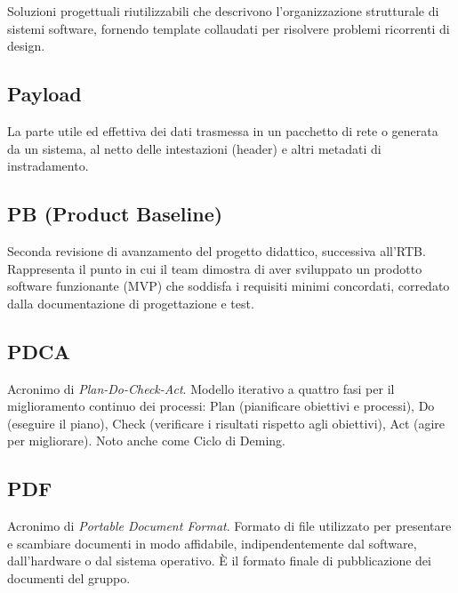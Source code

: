 \documentclass[a4paper, 11pt, oneside]{scrartcl} %
\begin{document}

Soluzioni progettuali riutilizzabili che descrivono l'organizzazione strutturale di sistemi software, fornendo template collaudati per risolvere problemi ricorrenti di design.

\vspace{0.5cm}

\subsection*{Payload}
La parte utile ed effettiva dei dati trasmessa in un pacchetto di rete o generata da un sistema, al netto delle intestazioni (header) e altri metadati di instradamento.
\vspace{0.5cm}

\subsection*{PB (Product Baseline)}
Seconda revisione di avanzamento del progetto didattico, successiva all'RTB. Rappresenta il punto in cui il team dimostra di aver sviluppato un prodotto software funzionante (MVP) che soddisfa i requisiti minimi concordati, corredato dalla documentazione di progettazione e test.
\vspace{0.5cm}

\subsection*{PDCA}
Acronimo di \textit{Plan-Do-Check-Act}. Modello iterativo a quattro fasi per il miglioramento continuo dei processi: Plan (pianificare obiettivi e processi), Do (eseguire il piano), Check (verificare i risultati rispetto agli obiettivi), Act (agire per migliorare). Noto anche come Ciclo di Deming.
\vspace{0.5cm}

\subsection*{PDF}
Acronimo di \textit{Portable Document Format}. Formato di file utilizzato per presentare e scambiare documenti in modo affidabile, indipendentemente dal software, dall'hardware o dal sistema operativo. È il formato finale di pubblicazione dei documenti del gruppo.
\vspace{0.5cm}
\end{document}
